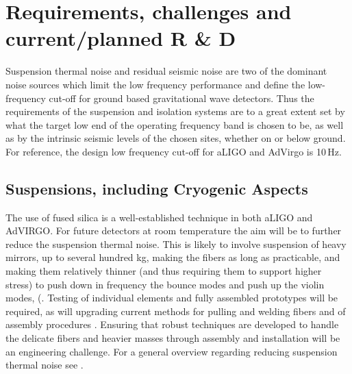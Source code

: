 \section{Requirements, challenges and current/planned R \& D}
Suspension thermal noise and residual seismic noise are two of the dominant noise sources which limit the low frequency performance and define the low-frequency cut-off for ground based gravitational wave detectors. Thus the requirements of the suspension and isolation systems are to a great extent set by what the target low end of the operating frequency band is chosen to be, as well as by the intrinsic seismic levels of the chosen sites, whether on or below ground. For reference, the design low frequency cut-off for aLIGO and AdVirgo is 10\,Hz.
\subsection{Suspensions, including Cryogenic Aspects}
The use of fused silica is a well-established technique in both aLIGO and AdVIRGO. For future detectors at room temperature the aim will be to further reduce the suspension thermal noise. This is likely to involve suspension of heavy mirrors, up to several hundred kg, making the fibers as long as practicable, and making them relatively thinner (and thus requiring them to support higher stress) to push down in frequency the bounce modes and push up the violin modes, (\cite{Heptonstall:2014, Bell:2014,aisa:2016advanced, Tokmakov:2012, Amico:2002_monolithic}.  Testing of individual elements and fully assembled prototypes will be required, as will upgrading current methods for pulling and welding fibers and of assembly procedures \cite{Hammond:2014,Travasso:2018}. Ensuring that robust techniques are developed to handle the delicate fibers and heavier masses through assembly and installation will be an engineering challenge. For a general overview regarding reducing suspension thermal noise see \cite{Hammond:2014, Hammond:2012}.

